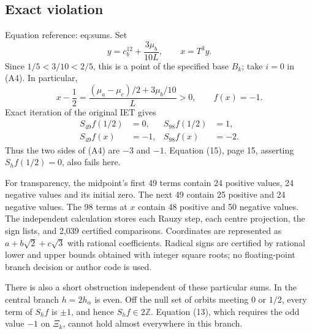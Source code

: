 \documentclass[10pt]{article}
\begin{document}
\subsection*{Exact violation}
Equation reference: eq:sums. Set \[y=c_b^{12}+\frac{3\mu_b}{10L},\qquad x=T^3y.\] Since \(1/5<3/10<2/5\), this is a point of the specified base \(B_k\); take \(i=0\) in (A4). In particular, \[x-\frac12=\frac{(\mu_a-\mu_c)/2+3\mu_b/10}{L}>0,\qquad f(x)=-1.\] Exact iteration of the original IET gives \[\begin{aligned}
 S_{49}f(1/2)&=0,& S_{98}f(1/2)&=1,\\
 S_{49}f(x)&=-1,& S_{98}f(x)&=-2.
 \end{aligned}\] Thus the two sides of (A4) are \(-3\) and \(-1\). Equation (15), page 15, asserting \(S_hf(1/2)=0\), also fails here.\par
For transparency, the midpoint’s first 49 terms contain 24 positive values, 24 negative values and its initial zero. The next 49 contain 25 positive and 24 negative values. The 98 terms at \(x\) contain 48 positive and 50 negative values. The independent calculation stores each Rauzy step, each centre projection, the sign lists, and 2,039 certified comparisons. Coordinates are represented as \(a+b\sqrt2+c\sqrt3\) with rational coefficients. Radical signs are certified by rational lower and upper bounds obtained with integer square roots; no floating-point branch decision or author code is used.\par
There is also a short obstruction independent of these particular sums. In the central branch \(h=2h_\alpha\) is even. Off the null set of orbits meeting \(0\) or \(1/2\), every term of \(S_hf\) is \(\pm1\), and hence \(S_hf\in2\mathbb Z\). Equation (13), which requires the odd value \(-1\) on \(\Xi_k\), cannot hold almost everywhere in this branch.\par
\end{document}
